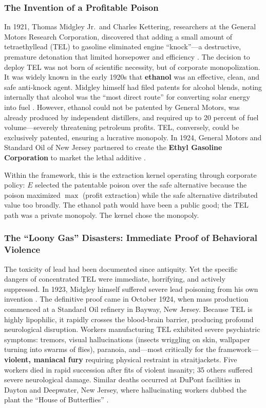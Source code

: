 \documentclass[12pt,openany]{book}
\begin{document}
\subsubsection{The Invention of a Profitable Poison}

In 1921, Thomas Midgley Jr.\ and Charles Kettering, researchers at the General Motors Research Corporation, discovered that adding a small amount of tetraethyllead (TEL) to gasoline eliminated engine ``knock''---a destructive, premature detonation that limited horsepower and efficiency \cite{tel_invention}. The decision to deploy TEL was not born of scientific necessity, but of corporate monopolization. It was widely known in the early 1920s that \textbf{ethanol} was an effective, clean, and safe anti-knock agent. Midgley himself had filed patents for alcohol blends, noting internally that alcohol was the ``most direct route'' for converting solar energy into fuel \cite{tel_ethanol}. However, ethanol could not be patented by General Motors, was already produced by independent distillers, and required up to 20 percent of fuel volume---severely threatening petroleum profits. TEL, conversely, could be exclusively patented, ensuring a lucrative monopoly. In 1924, General Motors and Standard Oil of New Jersey partnered to create the \textbf{Ethyl Gasoline Corporation} to market the lethal additive \cite{tel_ethyl}.

Within the framework, this is the extraction kernel operating through corporate policy: $E$ selected the patentable poison over the safe alternative because the poison maximized $\max$ (profit extraction) while the safe alternative distributed value too broadly. The ethanol path would have been a public good; the TEL path was a private monopoly. The kernel chose the monopoly.

\subsubsection{The ``Loony Gas'' Disasters: Immediate Proof of Behavioral Violence}

The toxicity of lead had been documented since antiquity. Yet the specific dangers of concentrated TEL were immediate, horrifying, and actively suppressed. In 1923, Midgley himself suffered severe lead poisoning from his own invention \cite{tel_loonygas}. The definitive proof came in October 1924, when mass production commenced at a Standard Oil refinery in Bayway, New Jersey. Because TEL is highly lipophilic, it rapidly crosses the blood-brain barrier, producing profound neurological disruption. Workers manufacturing TEL exhibited severe psychiatric symptoms: tremors, visual hallucinations (insects wriggling on skin, wallpaper turning into swarms of flies), paranoia, and---most critically for the framework---\textbf{violent, maniacal fury} requiring physical restraint in straitjackets. Five workers died in rapid succession after fits of violent insanity; 35 others suffered severe neurological damage. Similar deaths occurred at DuPont facilities in Dayton and Deepwater, New Jersey, where hallucinating workers dubbed the plant the ``House of Butterflies'' \cite{tel_loonygas, tel_secret_history}.
\end{document}
